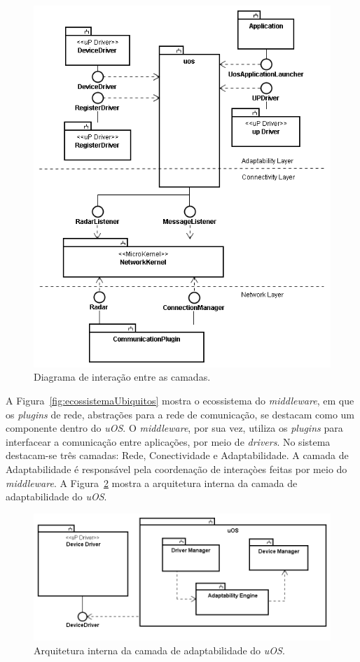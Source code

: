\begin{figure}[ht]
	\center
	\includegraphics[scale=0.4]{imagens/arquiteturaDoMiddlewareUOS}
	\caption{Diagrama de interação entre as camadas.}
	\label{fig:camadasUOS}
\end{figure}

A Figura~\ref{fig:ecossistemaUbiquitos} mostra o ecossistema do \emph{middleware}, em que os \emph{plugins} de rede, abstrações para a rede de comunicação, se destacam como um componente dentro do \emph{uOS}. O \emph{middleware}, por sua vez, utiliza os \emph{plugins} para interfacear a comunicação entre aplicações, por meio de \emph{drivers}. No sistema destacam-se três camadas: Rede, Conectividade e Adaptabilidade. A camada de Adaptabilidade é responsável pela coordenação de interaçòes feitas por meio do \emph{middleware}. A Figura~\ref{fig:diagramaDeBlocos} mostra a arquitetura interna da camada de adaptabilidade do \emph{uOS}.

\begin{figure}[ht]
	\center
	\includegraphics[scale=0.6]{imagens/diagramaDeBlocos}
	\caption{Arquitetura interna da camada de adaptabilidade do \emph{uOS}.}
	\label{fig:diagramaDeBlocos}
\end{figure}

